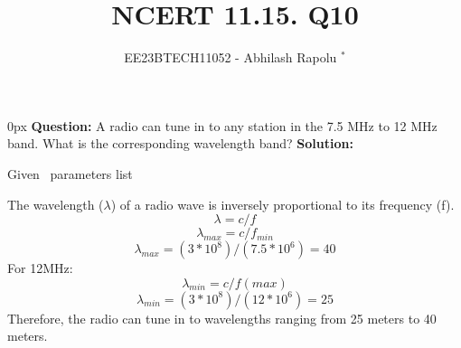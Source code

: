 \documentclass[journal,12pt,twocolumn]{IEEEtran}
\begin{document}

\vspace{3cm}
\title{NCERT 11.15. Q10}
\author{EE23BTECH11052 - Abhilash Rapolu $^{*}$%
}
\maketitle
\newpage
\bigskip
\renewcommand{\thetable}{\arabic{table}}

\parindent 0px
\textbf{Question:} A radio can tune in to any station in the 7.5 MHz to 12 MHz band.
 What is the corresponding wavelength band? 
\textbf{Solution:}  
\begin{table}[htbp] \small
\centering

\caption{Given \, parameters list}\end{table}
The wavelength ($\lambda$) of a radio wave is inversely proportional to its frequency (f).
\bgroup \obeylines
$$\lambda=c/f$$
$$\lambda_{max}=c/f_{min}$$
\egroup
\begin{equation}
\lambda_{max}=(3*10^{8})/(7.5*10^{6})=40
\end{equation}
For 12MHz:
$$\lambda_{min}=c/f(max)$$
\begin{equation}
\lambda_{min}=(3*10^{8})/(12*10^{6})=25
\end{equation}
Therefore, the radio can tune in to wavelengths ranging from 25 meters to 40 meters.
\end{document}
